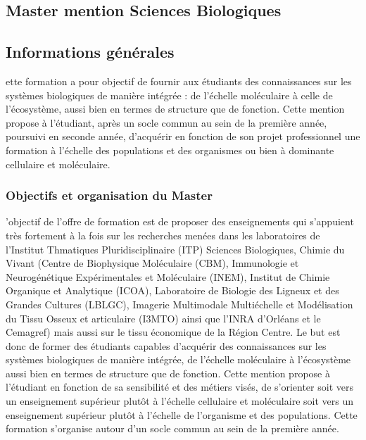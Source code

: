 \documentclass[10pt, a5paper]{report}
\begin{document}
\begin{spacing}{1.5}

\chapter*{Master mention Sciences Biologiques}

\footnotesize
\section*{Informations générales}


ette formation a pour objectif de fournir aux étudiants des connaissances sur les systèmes biologiques de manière intégrée : de l’échelle moléculaire à celle de l’écosystème, aussi bien en termes de structure que de fonction. Cette mention propose à l’étudiant,  après un socle commun au sein de la première année, poursuivi en seconde année, d’acquérir en fonction de son projet professionnel une formation à l’échelle des populations et des organismes ou bien à dominante cellulaire et moléculaire. 

\subsection*{Objectifs et organisation du Master}

’objectif de l’offre de formation est de proposer des enseignements qui s’appuient très fortement à la fois sur les recherches menées dans les laboratoires  de l’Institut Thmatiques Pluridisciplinaire (ITP) Sciences Biologiques, Chimie du Vivant (Centre de Biophysique Moléculaire (CBM), Immunologie et Neurogénétique Expérimentales et Moléculaire (INEM), Institut de Chimie Organique et Analytique (ICOA),  Laboratoire de Biologie des Ligneux et des Grandes Cultures (LBLGC), Imagerie Multimodale Multiéchelle et Modélisation du Tissu Osseux et articulaire (I3MTO) ainsi que l’INRA d’Orléans et le Cemagref) mais aussi sur le tissu économique de la Région Centre.  
Le but est donc de former des étudiants capables d’acquérir des connaissances sur les systèmes biologiques de manière intégrée, de l’échelle moléculaire à l’écosystème aussi bien en termes de structure que de fonction. Cette mention propose à l’étudiant en fonction de sa sensibilité et des métiers visés, de s’orienter soit vers un enseignement supérieur plutôt à l’échelle cellulaire et moléculaire soit vers un enseignement supérieur plutôt à l’échelle de l’organisme et des populations. Cette formation s’organise autour d’un socle commun au sein de la première année.


\end{spacing}
\end{document}
